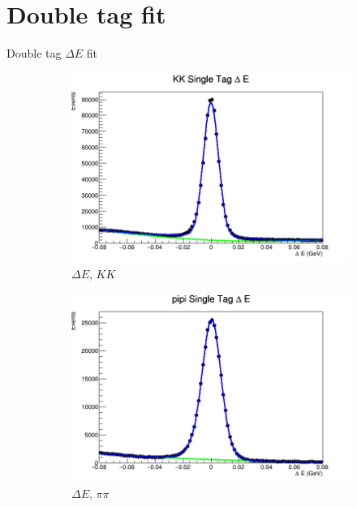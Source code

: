 \documentclass{beamer}
\begin{document}
\section{Double tag fit}
\begin{frame}{Double tag $\Delta E$ fit}
  \begin{figure}
    \centering
    \begin{subfigure}{0.4\textwidth}
      \centering
      \includegraphics[width=\textwidth]{KKDeltaE.png}
      \caption{$\Delta E$, $KK$}
    \end{subfigure}%
    \begin{subfigure}{0.4\textwidth}
      \centering
      \includegraphics[width=\textwidth]{pipiDeltaE.png}
      \caption{$\Delta E$, $\pi\pi$}
    \end{subfigure}
    \begin{subfigure}{0.4\textwidth}

\end{subfigure}
\end{figure}
\end{frame}
\end{document}
